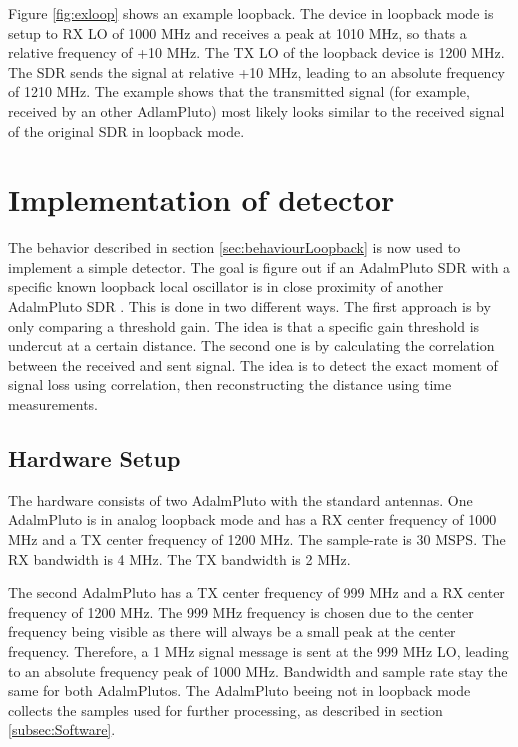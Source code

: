 \documentclass[journal]{IEEEtran}
\begin{document}
Figure \ref{fig:exloop} shows an example loopback.
The device in loopback mode is setup to RX LO of 1000 MHz and receives a peak at 1010 MHz, so thats a relative frequency of +10 MHz.
The TX LO of the loopback device is 1200 MHz.
The SDR sends the signal at relative +10 MHz, leading to an absolute frequency of 1210 MHz.
The example shows that the transmitted signal (for example, received by an other AdlamPluto) most likely  looks similar to the received signal of the original SDR in loopback mode.




\section{Implementation of detector}
\label{sec:implDetector}
The behavior described in section \ref{sec:behaviourLoopback} is now used to implement a simple detector. The goal is figure out if an AdalmPluto SDR with a specific known loopback local oscillator is in close proximity of another AdalmPluto SDR . 
This is done in two different ways.
The first approach is by only comparing a threshold gain.
The idea is that a specific gain threshold is undercut at a certain distance.
The second one is by calculating the correlation between the received and sent signal.
The idea is to detect the exact moment of signal loss using correlation, then reconstructing the distance using time measurements.


\subsection{Hardware Setup}
\label{subsec:hardware_setup}
The hardware consists of two AdalmPluto with the standard antennas. 
One AdalmPluto is in analog loopback mode and has a RX center frequency of 1000 MHz and a TX center frequency of 1200 MHz.
The sample-rate is 30 MSPS.
The RX bandwidth is 4 MHz.
The TX bandwidth is 2 MHz.

The second AdalmPluto has a TX center frequency of 999 MHz and a RX center frequency of 1200 MHz.
The 999 MHz frequency is chosen due to the center frequency being visible as there will always be a small peak at the center frequency.
Therefore, a 1 MHz signal message is sent at the 999 MHz LO, leading to an absolute frequency peak of 1000 MHz.
Bandwidth and sample rate stay the same for both AdalmPlutos.
The AdalmPluto beeing not in loopback mode collects the samples used for further processing, as described in section \ref{subsec:Software}.
\end{document}
